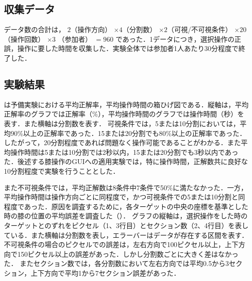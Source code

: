 \documentclass[submit, techrep]{ipsj}
\begin{document}
\subsection{収集データ}
データ数の合計は，
$2$（操作方向） $\times 4$（分割数） $\times 2$（可視/不可視条件） $\times 20$（操作回数） $\times 3$ （参加者） $= 960$
であった．1データにつき，選択操作の正誤，操作に要した時間を収集した．実験全体では参加者1人あたり30分程度で終了した．

\subsection{実験結果}
は予備実験における平均正解率，平均操作時間の箱ひげ図である．縦軸は，平均正解率のグラフでは正解率（$\%$），平均操作時間のグラフでは操作時間（秒）を表す．また横軸は分割数を表す．
可視条件では，5または10分割においては，平均90\%以上の正解率であった．15または20分割でも80\%以上の正解率であった．したがって，20分割程度であれば問題なく操作可能であることがわかる．また平均操作時間は5または10分割では2秒以内，15または20分割でも3秒以内であった．後述する膝操作のGUIへの適用実験では，特に操作時間，正解数共に良好な10分割程度で実験を行うこととした．
\par
また不可視条件では，平均正解数は8条件中7条件で50\%に満たなかった．一方，平均操作時間は操作方向ごとに同程度で，かつ可視条件での5または10分割と同程度であった．原因を調査するために，各ターゲットの中央の座標を基準とした時の膝の位置の平均誤差を調査した（）．
グラフの縦軸は，選択操作をした時のターゲットとのずれをピクセル（1、3行目）とセクション数（2、4行目）を表している．また横軸は分割数を表し，エラーバーはデータが存在する区間を表す．
不可視条件の場合のピクセルでの誤差は，左右方向で100ピクセル以上，上下方向で150ピクセル以上の誤差があった．しかし分割数ごとに大きく差はなかった．
またセクション数では，各分割数において左右方向では平均0.5から3セクション，上下方向で平均1から7セクション誤差があった．\par
{}
\end{document}
